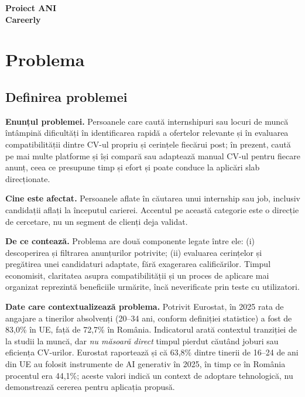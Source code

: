 \documentclass[12pt,a4paper]{article}
\begin{document}
\begin{center}
{\Large\bfseries Proiect ANI}\\[4pt]
{\bfseries Careerly}\\[6pt]
\end{center}

\section{Problema}
\subsection{Definirea problemei}
\textbf{Enunțul problemei.} Persoanele care caută internshipuri sau locuri de muncă întâmpină dificultăți în identificarea rapidă a ofertelor relevante și în evaluarea compatibilității dintre CV-ul propriu și cerințele fiecărui post; în prezent, caută pe mai multe platforme și își compară sau adaptează manual CV-ul pentru fiecare anunț, ceea ce presupune timp și efort și poate conduce la aplicări slab direcționate.

\textbf{Cine este afectat.} Persoanele aflate în căutarea unui internship sau job, inclusiv candidații aflați la începutul carierei. Accentul pe această categorie este o direcție de cercetare, nu un segment de clienți deja validat.

\textbf{De ce contează.} Problema are două componente legate între ele: (i) descoperirea și filtrarea anunțurilor potrivite; (ii) evaluarea cerințelor și pregătirea unei candidaturi adaptate, fără exagerarea calificărilor. Timpul economisit, claritatea asupra compatibilității și un proces de aplicare mai organizat reprezintă beneficiile urmărite, încă neverificate prin teste cu utilizatori.

\textbf{Date care contextualizează problema.} Potrivit Eurostat, în 2025 rata de angajare a tinerilor absolvenți (20--34 ani, conform definiției statistice) a fost de 83,0\% în UE, față de 72,7\% în România. Indicatorul arată contextul tranziției de la studii la muncă, dar \emph{nu măsoară direct} timpul pierdut căutând joburi sau eficiența CV-urilor. Eurostat raportează și că 63,8\% dintre tinerii de 16--24 de ani din UE au folosit instrumente de AI generativ în 2025, în timp ce în România procentul era 44,1\%; aceste valori indică un context de adoptare tehnologică, nu demonstrează cererea pentru aplicația propusă.
\end{document}
